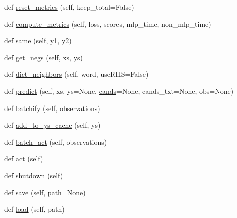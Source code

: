 \begin{DoxyCompactItemize}
def \hyperlink{classprojects_1_1personachat_1_1kvmemnn_1_1kvmemnn_1_1KvmemnnAgent_ad4f013360fde46e2974fcf0f65a99e3d}{reset\+\_\+metrics} (self, keep\+\_\+total=False)
\item 
def \hyperlink{classprojects_1_1personachat_1_1kvmemnn_1_1kvmemnn_1_1KvmemnnAgent_ac64d59e43aa1ca2b874c7e736bd3a93d}{compute\+\_\+metrics} (self, loss, scores, mlp\+\_\+time, non\+\_\+mlp\+\_\+time)
\item 
def \hyperlink{classprojects_1_1personachat_1_1kvmemnn_1_1kvmemnn_1_1KvmemnnAgent_a1b9834569393e1e53821567503fc6383}{same} (self, y1, y2)
\item 
def \hyperlink{classprojects_1_1personachat_1_1kvmemnn_1_1kvmemnn_1_1KvmemnnAgent_a09465d37d783449e34b969287abb1a0c}{get\+\_\+negs} (self, xs, ys)
\item 
def \hyperlink{classprojects_1_1personachat_1_1kvmemnn_1_1kvmemnn_1_1KvmemnnAgent_ab8a2b71536cfafcf4ed74a7a172ed81c}{dict\+\_\+neighbors} (self, word, use\+R\+HS=False)
\item 
def \hyperlink{classprojects_1_1personachat_1_1kvmemnn_1_1kvmemnn_1_1KvmemnnAgent_a40a3b9f66a331d05394869c709d4a02a}{predict} (self, xs, ys=None, \hyperlink{classprojects_1_1personachat_1_1kvmemnn_1_1kvmemnn_1_1KvmemnnAgent_a7f13d1272a33cdc7d0d6de07eaf67db8}{cands}=None, cands\+\_\+txt=None, obs=None)
\item 
def \hyperlink{classprojects_1_1personachat_1_1kvmemnn_1_1kvmemnn_1_1KvmemnnAgent_ab5ea8fd94b0871ae14c7fafe41aa7af2}{batchify} (self, observations)
\item 
def \hyperlink{classprojects_1_1personachat_1_1kvmemnn_1_1kvmemnn_1_1KvmemnnAgent_acdb68ad3ee78406e564655bfe27b2ef2}{add\+\_\+to\+\_\+ys\+\_\+cache} (self, ys)
\item 
def \hyperlink{classprojects_1_1personachat_1_1kvmemnn_1_1kvmemnn_1_1KvmemnnAgent_afded126c755a6cf5401a99f88f0799f9}{batch\+\_\+act} (self, observations)
\item 
def \hyperlink{classprojects_1_1personachat_1_1kvmemnn_1_1kvmemnn_1_1KvmemnnAgent_ace2d3cdd13cde1b41690ed55066a0d10}{act} (self)
\item 
def \hyperlink{classprojects_1_1personachat_1_1kvmemnn_1_1kvmemnn_1_1KvmemnnAgent_a1e8a1089e7ecea911029c96d95f8b62a}{shutdown} (self)
\item 
def \hyperlink{classprojects_1_1personachat_1_1kvmemnn_1_1kvmemnn_1_1KvmemnnAgent_a739a619a844360c3bf8a6e6b8879c341}{save} (self, path=None)
\item 
def \hyperlink{classprojects_1_1personachat_1_1kvmemnn_1_1kvmemnn_1_1KvmemnnAgent_a925938f3ecf2972ba0d35f0a915afdaf}{load} (self, path)
\end{DoxyCompactItemize}
